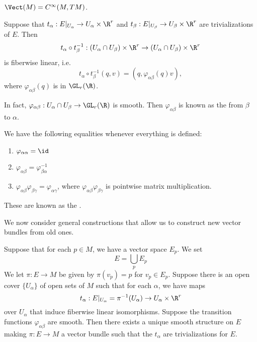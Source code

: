 \documentclass[a4paper]{article}
\begin{document}
\begin{eg}
  $\Vect(M) = C^\infty (M, TM)$.
\end{eg}

\begin{defi}
  Suppose that $t_\alpha: E|_{U_\alpha} \to U_\alpha \times \R^r$ and $t_\beta: E|_{U_\beta} \to U_\beta \times \R^r$ are trivializations of $E$. Then
  \[
    t_\alpha \circ t_\beta^{-1} : (U_\alpha \cap U_\beta) \times \R^r \to (U_\alpha \cap U_\beta) \times \R^r
  \]
  is fiberwise linear, i.e.
  \[
    t_\alpha \circ t_\beta^{-1}(q, v) = (q, \varphi_{\alpha\beta}(q) v),
  \]
  where $\varphi_{\alpha\beta}(q)$ is in $\GL_r(\R)$.

  In fact, $\varphi_{\alpha\beta}: U_\alpha \cap U_\beta \to \GL_r(\R)$ is smooth. Then $\varphi_{\alpha\beta}$ is known as the  from $\beta$ to $\alpha$.
\end{defi}

\begin{prop}
  We have the following equalities whenever everything is defined:
  \begin{enumerate}
    \item $\varphi_{\alpha\alpha} = \id$
    \item $\varphi_{\alpha\beta} = \varphi_{\beta\alpha}^{-1}$
    \item $\varphi_{\alpha\beta}\varphi_{\beta\gamma} = \varphi_{\alpha\gamma}$, where $\varphi_{\alpha\beta} \varphi_{\beta\gamma}$ is pointwise matrix multiplication.
  \end{enumerate}
  These are known as the .
\end{prop}
We now consider general constructions that allow us to construct new vector bundles from old ones.

\begin{prop}
  Suppose that for each $p \in M$, we have a vector space $E_p$. We set
  \[
    E = \bigcup_p E_p
  \]
  We let $\pi: E \to M$ be given by $\pi(v_p) = p$ for $v_p \in E_p$. Suppose there is an open cover $\{U_\alpha\}$ of open sets of $M$ such that for each $\alpha$, we have maps
  \[
    t_\alpha: E|_{U_\alpha} = \pi^{-1}(U_\alpha) \to U_\alpha \times \R^r
  \]
  over $U_\alpha$ that induce fiberwise linear isomorphisms. Suppose the transition functions $\varphi_{\alpha\beta}$ are smooth. Then there exists a unique smooth structure on $E$ making $\pi: E \to M$ a vector bundle such that the $t_\alpha$ are trivializations for $E$.
\end{prop}
\end{document}
